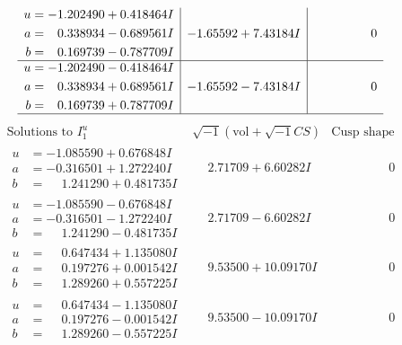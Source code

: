 \documentclass[1p]{elsarticle_modified}
\theoremstyle{definition}
\newcommand{\I}{\sqrt{-1}}
\begin{document}
$$\begin{array}{c|c|c}
\begin{aligned}
u &= -1.202490 + 0.418464 I \\
a &= \phantom{-}0.338934 - 0.689561 I \\
b &= \phantom{-}0.169739 - 0.787709 I\end{aligned}
 & -1.65592 + 7.43184 I & \phantom{-0.000000 } 0 \\ \hline\begin{aligned}
u &= -1.202490 - 0.418464 I \\
a &= \phantom{-}0.338934 + 0.689561 I \\
b &= \phantom{-}0.169739 + 0.787709 I\end{aligned}
 & -1.65592 - 7.43184 I & \phantom{-0.000000 } 0\\
 \hline 
 \end{array}$$\newpage$$\begin{array}{c|c|c}  
\text{Solutions to }I^u_{1}& \I (\text{vol} + \sqrt{-1}CS) & \text{Cusp shape}\\
 \hline 
\begin{aligned}
u &= -1.085590 + 0.676848 I \\
a &= -0.316501 + 1.272240 I \\
b &= \phantom{-}1.241290 + 0.481735 I\end{aligned}
 & \phantom{-}2.71709 + 6.60282 I & \phantom{-0.000000 } 0 \\ \hline\begin{aligned}
u &= -1.085590 - 0.676848 I \\
a &= -0.316501 - 1.272240 I \\
b &= \phantom{-}1.241290 - 0.481735 I\end{aligned}
 & \phantom{-}2.71709 - 6.60282 I & \phantom{-0.000000 } 0 \\ \hline\begin{aligned}
u &= \phantom{-}0.647434 + 1.135080 I \\
a &= \phantom{-}0.197276 + 0.001542 I \\
b &= \phantom{-}1.289260 + 0.557225 I\end{aligned}
 & \phantom{-}9.53500 + 10.09170 I & \phantom{-0.000000 } 0 \\ \hline\begin{aligned}
u &= \phantom{-}0.647434 - 1.135080 I \\
a &= \phantom{-}0.197276 - 0.001542 I \\
b &= \phantom{-}1.289260 - 0.557225 I\end{aligned}
 & \phantom{-}9.53500 - 10.09170 I & \phantom{-0.000000 } 0 \\ \hline\begin{aligned}

\end{aligned}
\end{array}$$
\end{document}
